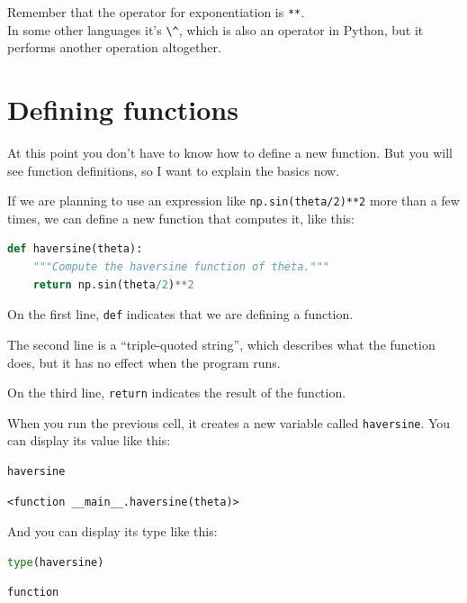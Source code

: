 Remember that the operator for exponentiation is
\passthrough{\lstinline!**!}.\\
In some other languages it's \passthrough{\lstinline!\^!}, which is also
an operator in Python, but it performs another operation altogether.

\hypertarget{defining-functions}{%
\section{Defining functions}\label{defining-functions}}

At this point you don't have to know how to define a new function. But
you will see function definitions, so I want to explain the basics now.

If we are planning to use an expression like
\passthrough{\lstinline!np.sin(theta/2)**2!} more than a few times, we
can define a new function that computes it, like this:

\begin{lstlisting}[language=Python,style=source]
def haversine(theta):
    """Compute the haversine function of theta."""
    return np.sin(theta/2)**2
\end{lstlisting}

On the first line, \passthrough{\lstinline!def!} indicates that we are
defining a function.

The second line is a ``triple-quoted string'', which describes what the
function does, but it has no effect when the program runs.

On the third line, \passthrough{\lstinline!return!} indicates the result
of the function.

When you run the previous cell, it creates a new variable called
\passthrough{\lstinline!haversine!}. You can display its value like
this:

\begin{lstlisting}[language=Python,style=source]
haversine
\end{lstlisting}

\begin{lstlisting}[style=output]
<function __main__.haversine(theta)>
\end{lstlisting}

And you can display its type like this:

\begin{lstlisting}[language=Python,style=source]
type(haversine)
\end{lstlisting}

\begin{lstlisting}[style=output]
function
\end{lstlisting}

